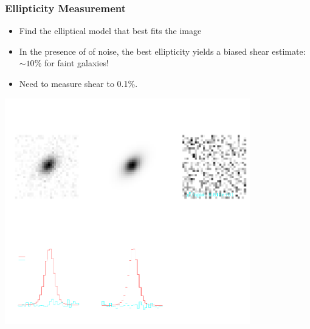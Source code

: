 \documentclass{beamer}
\begin{document}
\frame
{
    \frametitle{Ellipticity Measurement}

    \begin{itemize}

        \item Find the elliptical model that best fits the image

        \item In the presence of of noise, the best ellipticity yields a
            biased shear estimate: {\color{gold} $\sim 10$\%} for faint galaxies!
        \item Need to measure shear to {\color{gold} 0.1\%}.

    \end{itemize}
    \begin{center}


        \includegraphics[trim=0 200 0 50,clip,width=0.8\textwidth]{example-fit-hi-s2n-invert.pdf}
    \end{center}
}
\end{document}
